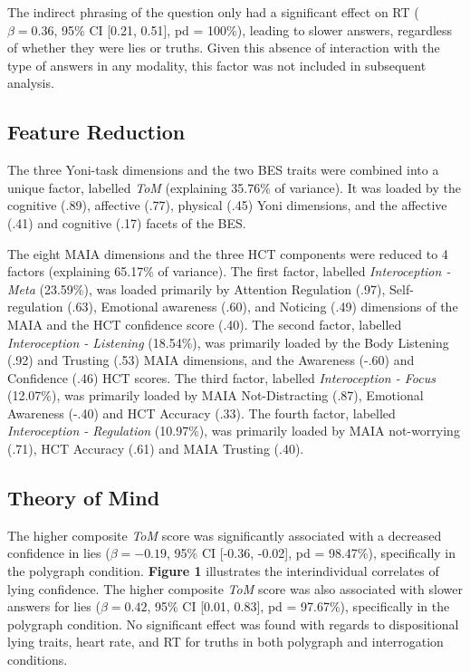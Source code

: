 \documentclass[
  man,mask,floatsintext]{apa6}
\begin{document}
The indirect phrasing of the question only had a significant effect on RT (\(\beta=0.36\), 95\% CI {[}0.21, 0.51{]}, pd = 100\%), leading to slower answers, regardless of whether they were lies or truths. Given this absence of interaction with the type of answers in any modality, this factor was not included in subsequent analysis.

\hypertarget{feature-reduction}{%
\subsection{Feature Reduction}\label{feature-reduction}}

The three Yoni-task dimensions and the two BES traits were combined into a unique factor, labelled \emph{ToM} (explaining 35.76\% of variance). It was loaded by the cognitive (.89), affective (.77), physical (.45) Yoni dimensions, and the affective (.41) and cognitive (.17) facets of the BES.

The eight MAIA dimensions and the three HCT components were reduced to 4 factors (explaining 65.17\% of variance). The first factor, labelled \emph{Interoception - Meta} (23.59\%), was loaded primarily by Attention Regulation (.97), Self-regulation (.63), Emotional awareness (.60), and Noticing (.49) dimensions of the MAIA and the HCT confidence score (.40). The second factor, labelled \emph{Interoception - Listening} (18.54\%), was primarily loaded by the Body Listening (.92) and Trusting (.53) MAIA dimensions, and the Awareness (-.60) and Confidence (.46) HCT scores. The third factor, labelled \emph{Interoception - Focus} (12.07\%), was primarily loaded by MAIA Not-Distracting (.87), Emotional Awareness (-.40) and HCT Accuracy (.33). The fourth factor, labelled \emph{Interoception - Regulation} (10.97\%), was primarily loaded by MAIA not-worrying (.71), HCT Accuracy (.61) and MAIA Trusting (.40).

\hypertarget{theory-of-mind}{%
\subsection{Theory of Mind}\label{theory-of-mind}}

The higher composite \emph{ToM} score was significantly associated with a decreased confidence in lies (\(\beta=-0.19\), 95\% CI {[}-0.36, -0.02{]}, pd = 98.47\%), specifically in the polygraph condition. \textbf{Figure 1} illustrates the interindividual correlates of lying confidence. The higher composite \emph{ToM} score was also associated with slower answers for lies (\(\beta=0.42\), 95\% CI {[}0.01, 0.83{]}, pd = 97.67\%), specifically in the polygraph condition. No significant effect was found with regards to dispositional lying traits, heart rate, and RT for truths in both polygraph and interrogation conditions.
\end{document}
